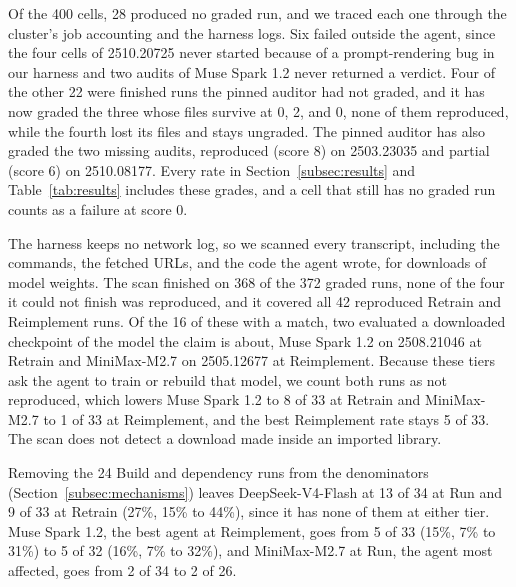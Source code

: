Of the 400 cells, 28 produced no graded run, and we traced each one through
the cluster's job accounting and the harness logs. Six failed outside the
agent, since the four cells of 2510.20725 never started because of a
prompt-rendering bug in our harness and two audits of Muse Spark 1.2 never
returned a verdict. Four of the other 22 were finished runs the pinned
auditor had not graded, and it has
now graded the three whose files survive at 0, 2, and 0, none of them
reproduced, while the fourth lost its files and stays ungraded. The pinned
auditor has also graded the two missing audits, reproduced (score 8) on
2503.23035 and partial (score 6) on 2510.08177. Every rate in Section~\ref{subsec:results} and Table~\ref{tab:results} includes these grades, and a cell that
still has no graded run counts as a failure at score 0.

The harness keeps no network log, so we scanned every transcript, including
the commands, the fetched URLs, and the code the agent wrote, for downloads of
model weights. The scan finished on 368 of the 372 graded runs, none of the
four it could not finish was reproduced, and it covered all 42 reproduced
Retrain and Reimplement runs. Of the 16 of these with a match, two evaluated a
downloaded checkpoint of the model the claim is about, Muse Spark 1.2 on
2508.21046 at Retrain and MiniMax-M2.7 on 2505.12677 at Reimplement. Because
these tiers ask the agent to train or rebuild that model, we count both runs
as not reproduced, which lowers Muse Spark 1.2 to 8 of 33 at Retrain and
MiniMax-M2.7 to 1 of 33 at Reimplement, and the best Reimplement rate stays 5 of 33. The scan does not detect a download made inside an imported library.

Removing the 24 Build and dependency runs from the denominators
(Section~\ref{subsec:mechanisms}) leaves DeepSeek-V4-Flash at 13 of 34 at Run
and 9 of 33 at Retrain (27\%, 15\% to 44\%), since it has none of them at
either tier. Muse Spark 1.2, the best agent at Reimplement, goes from 5 of 33
(15\%, 7\% to 31\%) to 5 of 32 (16\%, 7\% to 32\%), and MiniMax-M2.7 at Run,
the agent most affected, goes from 2 of 34 to 2 of 26.%

